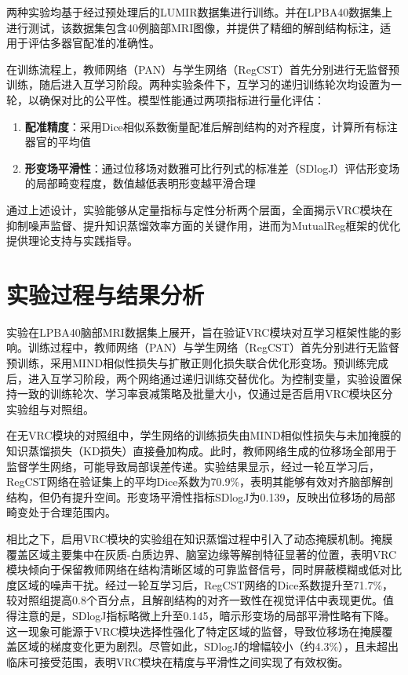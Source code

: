 两种实验均基于经过预处理后的LUMIR数据集进行训练。并在LPBA40数据集上进行测试，该数据集包含40例脑部MRI图像，并提供了精细的解剖结构标注，适用于评估多器官配准的准确性。

在训练流程上，教师网络（PAN）与学生网络（RegCST）首先分别进行无监督预训练，随后进入互学习阶段。两种实验条件下，互学习的递归训练轮次均设置为一轮，以确保对比的公平性。模型性能通过两项指标进行量化评估：

\begin{enumerate}
    \item \textbf{配准精度}：采用Dice相似系数衡量配准后解剖结构的对齐程度，计算所有标注器官的平均值
    \item \textbf{形变场平滑性}：通过位移场对数雅可比行列式的标准差（SDlogJ）评估形变场的局部畸变程度，数值越低表明形变越平滑合理
\end{enumerate}

通过上述设计，实验能够从定量指标与定性分析两个层面，全面揭示VRC模块在抑制噪声监督、提升知识蒸馏效率方面的关键作用，进而为MutualReg框架的优化提供理论支持与实践指导。

\section{实验过程与结果分析}

实验在LPBA40脑部MRI数据集上展开，旨在验证VRC模块对互学习框架性能的影响。训练过程中，教师网络（PAN）与学生网络（RegCST）首先分别进行无监督预训练，采用MIND相似性损失与扩散正则化损失联合优化形变场。预训练完成后，进入互学习阶段，两个网络通过递归训练交替优化。为控制变量，实验设置保持一致的训练轮次、学习率衰减策略及批量大小，仅通过是否启用VRC模块区分实验组与对照组。

在无VRC模块的对照组中，学生网络的训练损失由MIND相似性损失与未加掩膜的知识蒸馏损失（KD损失）直接叠加构成。此时，教师网络生成的位移场全部用于监督学生网络，可能导致局部误差传递。实验结果显示，经过一轮互学习后，RegCST网络在验证集上的平均Dice系数为70.9\%，表明其能够有效对齐脑部解剖结构，但仍有提升空间。形变场平滑性指标SDlogJ为0.139，反映出位移场的局部畸变处于合理范围内。

相比之下，启用VRC模块的实验组在知识蒸馏过程中引入了动态掩膜机制。掩膜覆盖区域主要集中在灰质-白质边界、脑室边缘等解剖特征显著的位置，表明VRC模块倾向于保留教师网络在结构清晰区域的可靠监督信号，同时屏蔽模糊或低对比度区域的噪声干扰。经过一轮互学习后，RegCST网络的Dice系数提升至71.7\%，较对照组提高0.8个百分点，且解剖结构的对齐一致性在视觉评估中表现更优。值得注意的是，SDlogJ指标略微上升至0.145，暗示形变场的局部平滑性略有下降。这一现象可能源于VRC模块选择性强化了特定区域的监督，导致位移场在掩膜覆盖区域的梯度变化更为剧烈。尽管如此，SDlogJ的增幅较小（约4.3\%），且未超出临床可接受范围，表明VRC模块在精度与平滑性之间实现了有效权衡。

